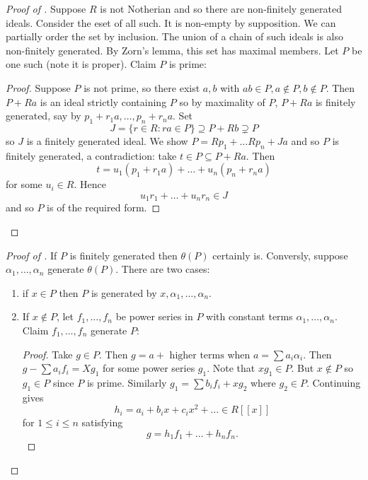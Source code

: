 \documentclass[a4paper]{article}
\begin{document}
\begin{proof}[Proof of ]
  Suppose \(R\) is not Notherian and so there are non-finitely generated ideals. Consider the eset of all such. It is non-empty by supposition. We can partially order the set by inclusion. The union of a chain of such ideals is also non-finitely generated. By Zorn's lemma, this set has maximal members. Let \(P\) be one such (note it is proper). Claim \(P\) is prime:

  \begin{proof}
    Suppose \(P\) is not prime, so there exist \(a, b\) with \(ab \in P, a \notin P, b \notin P\). Then \(P + Ra\) is an ideal strictly containing \(P\) so by maximality of \(P\), \(P + Ra\) is finitely generated, say by \(p_1 + r_1 a, \dots , p_n + r_n a\). Set
    \[
      J = \{r \in R: ra \in P\} \supseteq P + Rb \supsetneq P
    \]
    so \(J\) is a finitely generated ideal. We show \(P = Rp_1 + \dots Rp_n + Ja\) and so \(P\) is finitely generated, a contradiction: take \(t \in P \subseteq P + Ra\). Then
    \[
      t = u_1(p_1 + r_1a) + \dots + u_n(p_n + r_na)
    \]
    for some \(u_i \in R\). Hence
    \[
      u_1r_1 + \dots + u_nr_n \in J
    \]
    and so \(P\) is of the required form.
  \end{proof}
\end{proof}

\begin{proof}[Proof of ]
  If \(P\) is finitely generated then \(\theta(P)\) certainly is. Conversly, suppose \(\alpha_1, \dots, \alpha_n\) generate \(\theta(P)\). There are two cases:
  \begin{enumerate}
  \item if \(x \in P\) then \(P\) is generated by \(x, \alpha_1, \dots, \alpha_n\).
  \item If \(x \notin P\), let \(f_1, \dots, f_n\) be power series in \(P\) with constant terms \(\alpha_1, \dots, \alpha_n\). Claim \(f_1, \dots, f_n\) generate \(P\):

    \begin{proof}
      Take \(g \in P\). Then \(g = a + \text{ higher terms}\) when \(a = \sum a_i \alpha_i\). Then \(g - \sum a_i f_i = X g_1\) for some power series \(g_1\). Note that \(xg_1 \in P\). But \(x \notin P\) so \(g_1 \in P\) since \(P\) is prime. Similarly \(g_1 = \sum b_if_i + xg_2\) where \(g_2 \in P\). Continuing gives
      \[
        h_i = a_i + b_i x + c_i x^2 + \dots \in R[[x]]
      \]
      for \(1 \leq i \leq n\) satisfying
      \[
        g = h_1f_1 + \dots + h_n f_n.
      \]
    \end{proof}
  \end{enumerate}
\end{proof}
\end{document}
